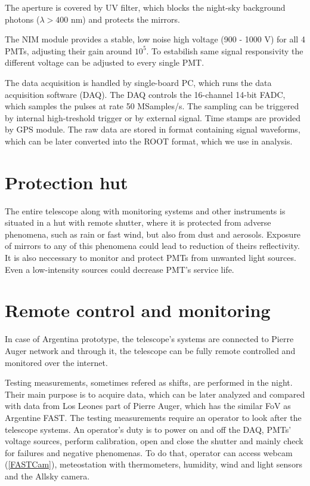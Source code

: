 \par
The aperture is covered by UV filter, which blocks the night-sky background photons ($\lambda > 400$ nm) and protects the mirrors.


\par
The NIM module provides a stable, low noise high voltage (900 - 1000 V) for all 4 PMTs, adjusting their gain around $10^5$. To estabilish same signal responsivity the different voltage can be adjusted to every single PMT.
\par
The data acquisition is handled by single-board PC, which runs the data acquisition software (DAQ). The DAQ controls the 16-channel 14-bit FADC, which samples the pulses at rate 50 MSamples/s. The sampling can be triggered by internal high-treshold trigger or by external signal. Time stamps are provided by GPS module. The raw data are stored in format containing signal waveforms, which can be later converted into the ROOT format, which we use in analysis.
\section{Protection hut}
The entire telescope along with monitoring systems and other instruments is situated in a hut with remote shutter, where it is protected from adverse phenomena, such as rain or fast wind, but also from dust and aerosols. Exposure of mirrors to any of this phenomena could lead to reduction of theirs reflectivity. It is also neccessary to monitor and protect PMTs from unwanted light sources. Even a low-intensity sources could decrease PMT's service life.

\section{Remote control and monitoring}
In case of Argentina prototype, the telescope's systems are connected to Pierre Auger network and through it, the telescope can be fully remote controlled and monitored over the internet. 

\par
Testing measurements, sometimes refered as shifts, are performed in the night. Their main purpose is to acquire data, which can be later analyzed and compared with data from Los Leones part of Pierre Auger, which has the similar FoV as Argentine FAST. 
The testing measurements require an operator to look after the telescope systems. An operator's duty is to power on and off the DAQ, PMTs' voltage sources, perform calibration, open and close the shutter and mainly check for failures and negative phenomenas. To do that, operator can access webcam (\ref{FASTCam}), meteostation with thermometers, humidity, wind and light sensors and the Allsky camera.

